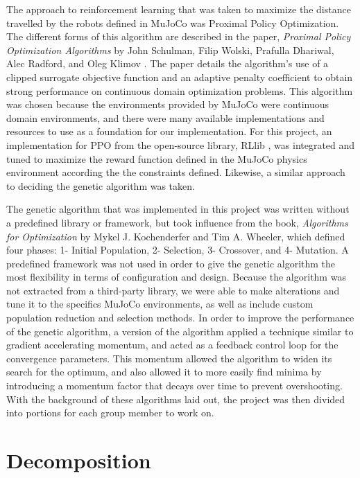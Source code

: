 \documentclass{article}
\begin{document}
    The approach to reinforcement learning that was taken to maximize the 
distance travelled by the robots defined in MuJoCo was Proximal Policy 
Optimization. The different forms of this algorithm are described in the 
paper, \emph{Proximal Policy Optimization Algorithms} by John 
Schulman, Filip Wolski, Prafulla Dhariwal, Alec Radford, and Oleg Klimov \cite{ppo}. The
paper details the algorithm's use of a clipped surrogate objective function 
and an adaptive penalty coefficient to obtain strong performance on 
continuous domain optimization problems. This algorithm was chosen because 
the environments provided by MuJoCo were continuous domain environments, and 
there were many available implementations and resources to use as a 
foundation for our implementation. For this project, an implementation for 
PPO from the open-source library, RLlib \cite{rllib}, was integrated and 
tuned to maximize the reward function defined  in the MuJoCo physics 
environment according the the constraints defined. Likewise, a similar 
approach to deciding the genetic algorithm was taken.

    The genetic algorithm that was implemented in this project was written 
without a predefined library or framework, but took influence from the book, 
\emph{Algorithms for Optimization} \cite{algorithmsforoptimization} by  Mykel
J. Kochenderfer and Tim A. Wheeler, which defined four phases: 1- Initial Population, 
2- Selection, 3- Crossover, and 4- Mutation. A predefined framework was not used in order to give
the genetic algorithm the most flexibility in terms of configuration and 
design. Because the algorithm was not extracted from a third-party library, we were able to make alterations and tune it
to the specifics MuJoCo environments, as well as
include custom population reduction and selection methods. In order to 
improve the performance of the genetic algorithm, a version of the algorithm 
applied a technique similar to gradient accelerating momentum, and acted as a feedback control loop for the convergence parameters. This momentum allowed the  
algorithm to widen its search for the optimum, and also allowed it to more easily find minima by introducing a 
momentum factor that decays over time to prevent overshooting. With the 
background of these algorithms laid out, the project was then divided into 
portions for each group member to work on.

\section{Decomposition}
    
\end{document}
